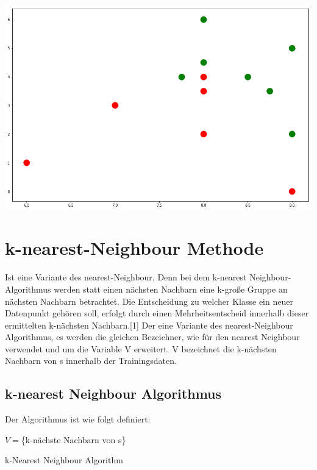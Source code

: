 \documentclass[fontsize=11pt]{scrartcl}
\newenvironment{Figure}
  {\par\medskip\noindent\minipage{\linewidth}}
  {\endminipage\par\medskip}
\begin{document}
\begin{Figure}
\begin{minipage}[b]{.4\linewidth}
                        \includegraphics[scale=0.2]{errnn3.png}
                    \end{minipage}
                \end{Figure}           
                
                         
        \section{k-nearest-Neighbour Methode}
            Ist eine Variante des nearest-Neighbour. Denn bei dem k-nearest Neighbour-Algorithmus werden statt einen nächsten Nachbarn eine k-große Gruppe an nächsten Nachbarn betrachtet. Die Entscheidung zu welcher Klasse ein neuer Datenpunkt gehören soll, erfolgt durch einen Mehrheitsentscheid innerhalb dieser ermittelten k-nächsten Nachbarn.[1]
            Der eine Variante des nearest-Neighbour Algorithmus, es werden die gleichen Bezeichner, wie für den nearest Neighbour verwendet und um die Variable V erweitert. V bezeichnet die k-nächsten Nachbarn von s innerhalb der Trainingsdaten.
        
                           
            \subsection{k-nearest Neighbour Algorithmus}
                Der Algorithmus ist wie folgt definiert:\\
                \begin{algorithm}[H]
                    $V= $\{k-nächste Nachbarn von s\}\;
                    {
                        \;
                    }
                           
                    \caption{k-Nearest Neighbour Algorithm}
                \end{algorithm}
                            
\end{document}
